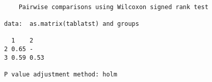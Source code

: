 \documentclass[11pt]{article}
\begin{document}
    
    
    \begin{verbatim}

	Pairwise comparisons using Wilcoxon signed rank test 

data:  as.matrix(tablatst) and groups 

  1    2   
2 0.65 -   
3 0.59 0.53

P value adjustment method: holm 
    \end{verbatim}

    

    
    
    
    
\end{document}

